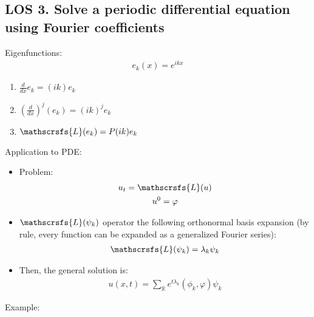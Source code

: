 \documentclass[12pt, a4paper]{article}
\begin{document}
\subsection*{LOS 3. Solve a periodic differential equation using Fourier coefficients}
Eigenfunctions:
\begin{gather*}
    e_k(x) = e^{ikx}
\end{gather*}
\begin{enumerate}
    \item $\frac{d}{dx}e_k = (ik)e_k$
    \item $\left(\frac{d}{dx}\right)^j(e_k) = (ik)^je_k$
    \item $\mathscrsfs{L}(e_k) = P(ik)e_k$\\
\end{enumerate}
Application to PDE:
\begin{itemize}
    \item Problem:
    \begin{gather*}
        u_t = \mathscrsfs{L}(u) \\
        u^0 = \varphi
    \end{gather*}
    \item $\mathscrsfs{L}(\psi_k)$ operator the following orthonormal basis expansion (by rule, every function can be expanded as a generalized Fourier series):
    \begin{gather*}
        \mathscrsfs{L}(\psi_k) = \lambda_k\psi_k
    \end{gather*}
    \item Then, the general solution is:
    \begin{gather*}
        u(x, t) = \sum_{\mathbb{R}} e^{t\lambda_k}(\phi_k, \varphi)\psi_k
    \end{gather*}
\end{itemize}
Example:
\end{document}
